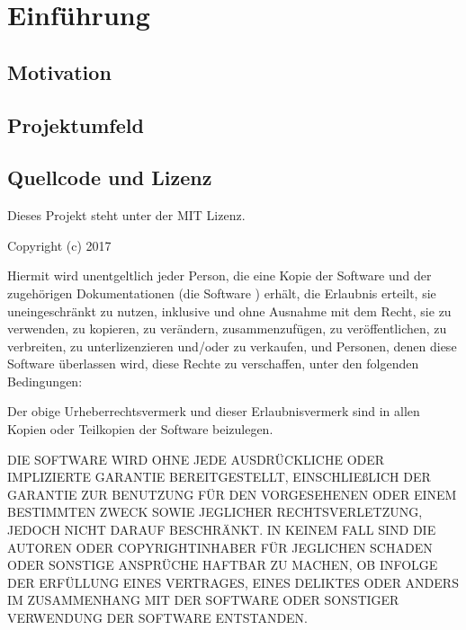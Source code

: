 \chapter{Einführung}
\label{cha:Einleitung}


\section{Motivation}
\label{sec:Motivation}

\section{Projektumfeld}
\label{sec:Projektumfeld}

\section{Quellcode und Lizenz}
\label{sec:licens_code}


Dieses Projekt steht unter der MIT Lizenz.

\vspace*{5mm} \noindent Copyright (c) 2017 \autor

\vspace*{5mm} \noindent Hiermit wird unentgeltlich jeder Person, die eine Kopie der Software und der zugehörigen Dokumentationen (die \glqq Software \grqq) erhält, die Erlaubnis erteilt, sie uneingeschränkt zu nutzen, inklusive und ohne Ausnahme mit dem Recht, sie zu verwenden, zu kopieren, zu verändern, zusammenzufügen, zu veröffentlichen, zu verbreiten, zu unterlizenzieren und/oder zu verkaufen, und Personen, denen diese Software überlassen wird, diese Rechte zu verschaffen, unter den folgenden Bedingungen:

\noindent Der obige Urheberrechtsvermerk und dieser Erlaubnisvermerk sind in allen Kopien oder Teilkopien der Software beizulegen.

\vspace*{5mm} \noindent DIE SOFTWARE WIRD OHNE JEDE AUSDRÜCKLICHE ODER IMPLIZIERTE GARANTIE BEREITGESTELLT, EINSCHLIEßLICH DER GARANTIE ZUR BENUTZUNG FÜR DEN VORGESEHENEN ODER EINEM BESTIMMTEN ZWECK SOWIE JEGLICHER RECHTSVERLETZUNG, JEDOCH NICHT DARAUF BESCHRÄNKT. IN KEINEM FALL SIND DIE AUTOREN ODER COPYRIGHTINHABER FÜR JEGLICHEN SCHADEN ODER SONSTIGE ANSPRÜCHE HAFTBAR ZU MACHEN, OB INFOLGE DER ERFÜLLUNG EINES VERTRAGES, EINES DELIKTES ODER ANDERS IM ZUSAMMENHANG MIT DER SOFTWARE ODER SONSTIGER VERWENDUNG DER SOFTWARE ENTSTANDEN.
